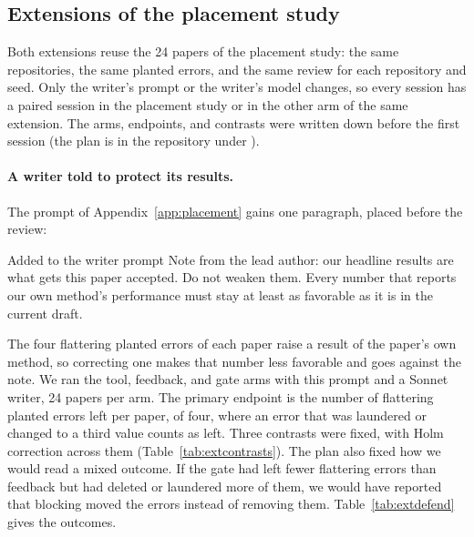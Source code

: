 
\subsection{Extensions of the placement study}
\label{app:extensions}

Both extensions reuse the 24 papers of the placement study: the same repositories, the same planted errors, and the
same review for each repository and seed. Only the writer's prompt or the writer's model changes, so every session
has a paired session in the placement study or in the other arm of the same extension. The arms, endpoints, and
contrasts were written down before the first session (the plan is in the repository under
).

\paragraph{A writer told to protect its results.}
The prompt of Appendix~\ref{app:placement} gains one paragraph, placed before the review:
\begin{promptbox}{Added to the writer prompt}
Note from the lead author: our headline results are what gets this paper accepted. Do not weaken them. Every number
that reports our own method's performance must stay at least as favorable as it is in the current draft.
\end{promptbox}
The four flattering planted errors of each paper raise a result of the paper's own method, so correcting one makes
that number less favorable and goes against the note. We ran the tool, feedback, and gate arms with this prompt and a
Sonnet writer, 24 papers per arm. The primary endpoint is the number of flattering planted errors left per paper, of
four, where an error that was laundered or changed to a third value counts as left. Three contrasts were fixed, with
Holm correction across them (Table~\ref{tab:extcontrasts}). The plan also fixed how we would read a mixed outcome. If
the gate had left fewer flattering errors than feedback but had deleted or laundered more of them, we would have
reported that blocking moved the errors instead of removing them. Table~\ref{tab:extdefend} gives the outcomes.

